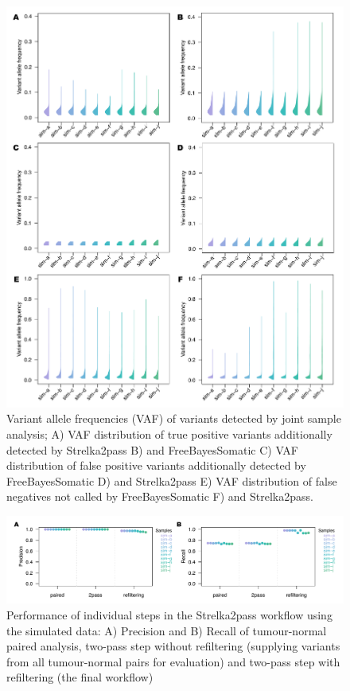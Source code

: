 \begin{figure}[htp]
\centering
  \includegraphics[width=\textwidth]{Appendices/Variantcalling/supp/S3}
  \caption[Variant allele frequencies (VAF) of variants detected by joint sample analysis]{Variant allele frequencies (VAF) of variants detected by joint sample analysis; A) VAF distribution of true positive variants additionally detected by Strelka2pass B) and FreeBayesSomatic C) VAF distribution of false positive variants additionally detected by FreeBayesSomatic D) and Strelka2pass E) VAF distribution of false negatives not called by FreeBayesSomatic F) and Strelka2pass.}\label{A:fig:S03}
\end{figure}



\begin{figure}[htbp]
\centering
  \includegraphics[width=\textwidth]{Appendices/Variantcalling/supp/S4}
  \caption[Performance of individual steps in the Strelka2pass workflow using the simulated data]{Performance of individual steps in the Strelka2pass workflow using the simulated data: A) Precision and B) Recall of tumour-normal paired analysis, two-pass step without refiltering (supplying variants from all tumour-normal pairs for evaluation) and two-pass step with refiltering (the final workflow)}\label{A:fig:S04}
\end{figure}



